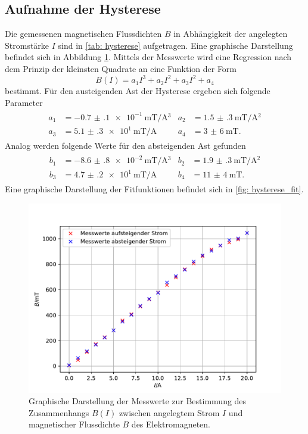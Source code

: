 \subsection{Aufnahme der Hysterese}
Die gemessenen magnetischen Flussdichten $B$ in Abhängigkeit der angelegten Stromstärke $I$
sind in \autoref{tab: hysterese} aufgetragen. Eine graphische Darstellung befindet sich in Abbildung
\ref{fig: hysterese_gesamt}. Mittels der Messwerte wird eine Regression nach dem Prinzip der kleinsten Quadrate
an eine Funktion der Form
\begin{equation}
  B(I) = a_1 I^3 + a_2 I^2 + a_3 I ^2 + a_4
  \label{eq: fitfuntion_hysterese}
\end{equation}
bestimmt. Für den austeigenden Ast der Hysterese ergeben sich folgende Parameter
\begin{align}
  \begin{aligned}
    a_1 &= \SI{-0.7(1)e-1}{\milli\tesla \per \ampere ^3} & a_2 &= \SI{1.5(3)}{\milli\tesla \per \ampere ^2} \\ %
    a_3 &= \SI{5.1(3)e1}{\milli\tesla \per \ampere } & a_4 &= \SI{3(6)}{\milli\tesla }.
    \label{eq: params_up}
  \end{aligned}
\end{align}
Analog werden folgende Werte für den absteigenden Ast gefunden
\begin{align}
  \begin{aligned}
    b_1 &= \SI{-8.6(8)e-2}{\milli\tesla \per \ampere ^3} & b_2 &= \SI{1.9(3)}{\milli\tesla \per \ampere ^2} \\
    b_3 &= \SI{4.7(2)e1}{\milli\tesla \per \ampere } & b_4 &= \SI{11(4)}{\milli\tesla }.
  \end{aligned}
\end{align}
Eine graphische Darstellung der Fitfunktionen befindet sich in \autoref{fig: hysterese_fit}.

\begin{figure}
  \centering
  \includegraphics[width = \textwidth]{../Messdaten/plots/hysterese_data.pdf}
  \caption{Graphische Darstellung der Messwerte zur Bestimmung des Zusammenhangs $B(I)$ zwischen angelegtem Strom $I$ und
  magnetischer Flussdichte $B$ des Elektromagneten.}
  \label{fig: hysterese_gesamt}
\end{figure}

